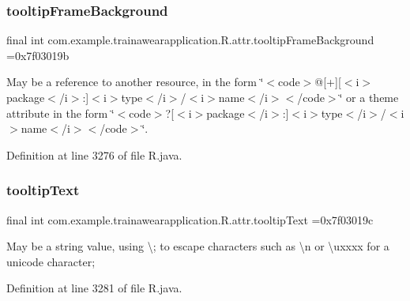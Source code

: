 \subsubsection{\texorpdfstring{tooltipFrameBackground}{tooltipFrameBackground}}
{\footnotesize\ttfamily final int com.\+example.\+trainawearapplication.\+R.\+attr.\+tooltip\+Frame\+Background =0x7f03019b\hspace{0.3cm}{\ttfamily [static]}}

May be a reference to another resource, in the form \char`\"{}$<$code$>$@\mbox{[}+\mbox{]}\mbox{[}$<$i$>$package$<$/i$>$\+:\mbox{]}$<$i$>$type$<$/i$>$/$<$i$>$name$<$/i$>$$<$/code$>$\char`\"{} or a theme attribute in the form \char`\"{}$<$code$>$?\mbox{[}$<$i$>$package$<$/i$>$\+:\mbox{]}$<$i$>$type$<$/i$>$/$<$i$>$name$<$/i$>$$<$/code$>$\char`\"{}. 

Definition at line 3276 of file R.\+java.

\mbox{\label{classcom_1_1example_1_1trainawearapplication_1_1_r_1_1attr_ad8bb6c3bd7079cfe2544b0ae9e9f6b4b}} 
\subsubsection{\texorpdfstring{tooltipText}{tooltipText}}
{\footnotesize\ttfamily final int com.\+example.\+trainawearapplication.\+R.\+attr.\+tooltip\+Text =0x7f03019c\hspace{0.3cm}{\ttfamily [static]}}

May be a string value, using \textquotesingle{}\textbackslash{};\textquotesingle{} to escape characters such as \textquotesingle{}\textbackslash{}n\textquotesingle{} or \textquotesingle{}\textbackslash{}uxxxx\textquotesingle{} for a unicode character; 

Definition at line 3281 of file R.\+java.

\mbox{\label{classcom_1_1example_1_1trainawearapplication_1_1_r_1_1attr_a98307f15b2f023fe9c80a728227bbb0a}} 
